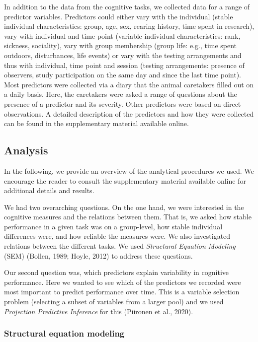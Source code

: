\documentclass[
  man,floatsintext]{apa6}
\begin{document}
In addition to the data from the cognitive tasks, we collected data for a range of predictor variables. Predictors could either vary with the individual (stable individual characteristics: group, age, sex, rearing history, time spent in research), vary with individual and time point (variable individual characteristics: rank, sickness, sociality), vary with group membership (group life: e.g., time spent outdoors, disturbances, life events) or vary with the testing arrangements and thus with individual, time point and session (testing arrangements: presence of observers, study participation on the same day and since the last time point). Most predictors were collected via a diary that the animal caretakers filled out on a daily basis. Here, the caretakers were asked a range of questions about the presence of a predictor and its severity. Other predictors were based on direct observations. A detailed description of the predictors and how they were collected can be found in the supplementary material available online.

\hypertarget{analysis}{%
\subsection{Analysis}\label{analysis}}

In the following, we provide an overview of the analytical procedures we used. We encourage the reader to consult the supplementary material available online for additional details and results.

We had two overarching questions. On the one hand, we were interested in the cognitive measures and the relations between them. That is, we asked how stable performance in a given task was on a group-level, how stable individual differences were, and how reliable the measures were. We also investigated relations between the different tasks. We used \emph{Structural Equation Modeling} (SEM) (Bollen, 1989; Hoyle, 2012) to address these questions.

Our second question was, which predictors explain variability in cognitive performance. Here we wanted to see which of the predictors we recorded were most important to predict performance over time. This is a variable selection problem (selecting a subset of variables from a larger pool) and we used \emph{Projection Predictive Inference} for this (Piironen et al., 2020).

\hypertarget{structural-equation-modeling}{%
\subsubsection{Structural equation modeling}\label{structural-equation-modeling}}
\end{document}

